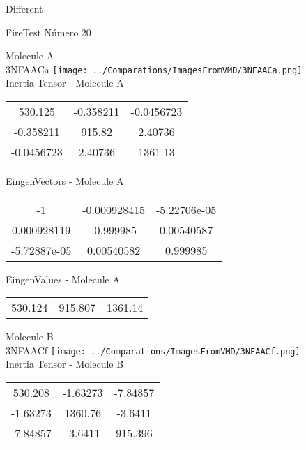 \begin{center}
\vtab
\vtab
\textcolor{NavyBlue}{\Large Different}
\end{center}

 \newpage

\vtab[-2cm]
\begin{center}
{\large FireTest \tab Número 20}
\end{center}
\begin{multicols}{2}
\begin{center}

Molecule A \\ 
3NFAACa
\texttt{[image: ../Comparations/ImagesFromVMD/3NFAACa.png]}
\\
Inertia Tensor - Molecule A \\
\vtab

\begin{tabular}{|c c c|}
530.125	 & 	-0.358211	 & 	-0.0456723	 \\
-0.358211	 & 	915.82	 & 	2.40736	 \\
-0.0456723	 & 	2.40736	 & 	1361.13
\end{tabular}

\vtab
 EingenVectors - Molecule A     \\
\vtab
\begin{tabular}{|c c c|}
-1	 & 	-0.000928415	 & 	-5.22706e-05	 \\
0.000928119	 & 	-0.999985	 & 	0.00540587	 \\
-5.72887e-05	 & 	0.00540582	 & 	0.999985
\end{tabular}

\vtab
 EingenValues - Molecule A     \\
\vtab
\begin{tabular}{|c c c|}
530.124	 & 	915.807	 & 	1361.14	 \\
\end{tabular}
\columnbreak

Molecule B \\ 
3NFAACf
\texttt{[image: ../Comparations/ImagesFromVMD/3NFAACf.png]}
\\
Inertia Tensor - Molecule B \\
\vtab

\begin{tabular}{|c c c|}
530.208	 & 	-1.63273	 & 	-7.84857	 \\
-1.63273	 & 	1360.76	 & 	-3.6411	 \\
-7.84857	 & 	-3.6411	 & 	915.396
\end{tabular}


\end{center}
\end{multicols}
